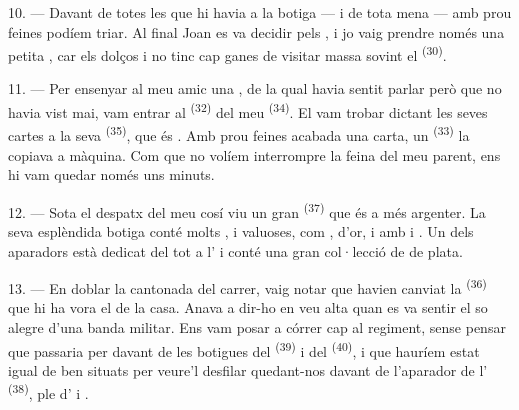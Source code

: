 10. --- Davant de totes les  que hi havia a la botiga ---
 i  de tota mena --- amb
prou feines podíem triar. Al final Joan es va decidir pels , i jo vaig prendre només una petita , car els
dolços  i no tinc cap ganes de visitar massa sovint
el  \textsuperscript{(30)}.

\VUsaut{3.0mm}

11. --- Per ensenyar al meu amic una , de la qual havia
sentit parlar però que no havia vist mai, vam entrar al 
\textsuperscript{(32)} del meu  \textsuperscript{(34)}. El vam trobar
dictant les seves cartes a la seva  \textsuperscript{(35)}, que
és . Amb prou feines acabada una carta, un
 \textsuperscript{(33)} la copiava a màquina. Com que no volíem
interrompre la feina del meu parent, ens hi vam quedar només uns minuts.

12. --- Sota el despatx del meu cosí viu un gran 
\textsuperscript{(37)} que és a més argenter. La seva esplèndida botiga conté molts
,
 i  valuoses, com ,
 d'or,  i  amb  i . Un dels aparadors està dedicat del tot a
l' i conté una gran col·lecció de  de plata.

13. --- En doblar la cantonada del carrer, vaig notar que havien canviat la
 \textsuperscript{(36)} que hi ha vora el  de la casa.
Anava a dir-ho en veu alta quan es va sentir el so alegre d'una banda militar. Ens
vam posar a córrer cap al regiment, sense pensar que passaria per davant de les
botigues del  \textsuperscript{(39)} i del 
\textsuperscript{(40)}, i que hauríem estat igual de ben situats per veure'l
desfilar quedant-nos davant de l'aparador de l'
\textsuperscript{(38)}, ple d' i
.

\VUsaut{3.0mm}

